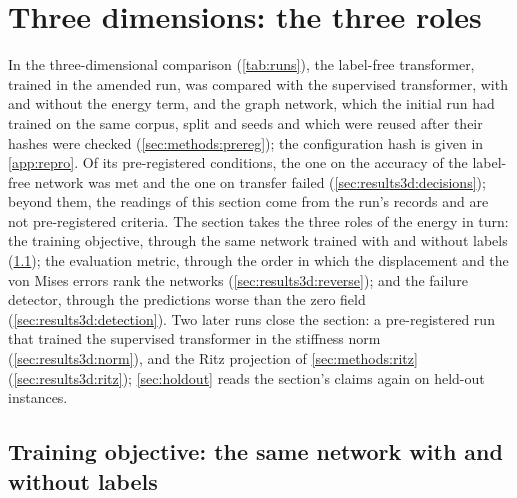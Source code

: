 \section{Three dimensions: the three roles}\label{sec:results3d}

In the three-dimensional comparison (\cref{tab:runs}), the label-free transformer, trained
in the amended run, was compared with the supervised transformer, with and without the
energy term, and the graph network, which the initial run had trained on the same corpus,
split and seeds and which were reused after their hashes were checked
(\cref{sec:methods:prereg}); the configuration hash is given in \ref{app:repro}. Of its
pre-registered conditions, the one on the accuracy of the label-free network was met and the
one on transfer failed (\cref{sec:results3d:decisions}); beyond them, the readings of this
section come from the run's records and are not pre-registered criteria. The section takes
the three roles of the energy in turn: the training objective, through the same network
trained with and without labels (\cref{sec:results3d:same}); the evaluation metric, through
the order in which the displacement and the von Mises errors rank the networks
(\cref{sec:results3d:reverse}); and the failure detector, through the predictions worse than
the zero field (\cref{sec:results3d:detection}). Two later runs close the section: a
pre-registered run that trained the supervised transformer in the stiffness norm
(\cref{sec:results3d:norm}), and the Ritz projection of \cref{sec:methods:ritz}
(\cref{sec:results3d:ritz}); \cref{sec:holdout} reads the section's claims again on held-out
instances.

\subsection{Training objective: the same network with and without labels}\label{sec:results3d:same}




